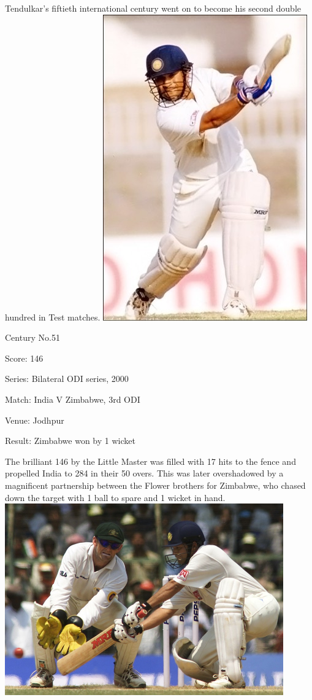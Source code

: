 \documentclass[11pt, a4paper]{article}
\begin{document}
Tendulkar's fiftieth international century went on to become his second double hundred in Test matches.
\newpage
\includegraphics[height=0.8\textheight]{pics/51.jpg}

Century No.51 

Score: 146 

Series: Bilateral ODI series, 2000 

Match: India V Zimbabwe, 3rd ODI 

Venue: Jodhpur 

Result: Zimbabwe won by 1 wicket 

The brilliant 146 by the Little Master was filled with 17 hits to the fence and propelled India to 284 in their 50 overs. This was later overshadowed by a magnificent partnership between the Flower brothers for Zimbabwe, who chased down the target with 1 ball to spare and 1 wicket in hand.
\newpage
\includegraphics[width=0.9\textwidth]{pics/52.jpg}
\end{document}
